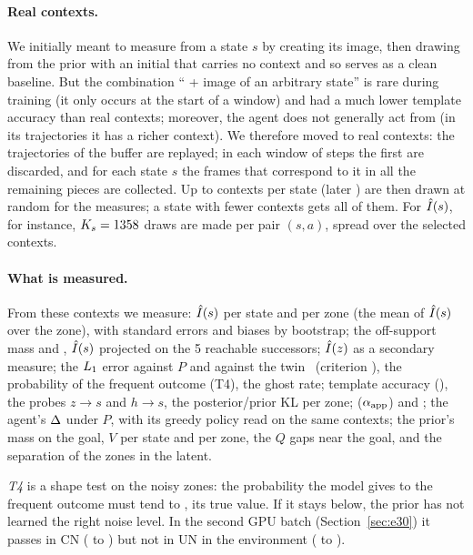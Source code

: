 \documentclass[10pt]{article}
\begin{document}
\paragraph{Real contexts.}
We initially meant to measure from a state $s$ by creating its image, then drawing from the prior with an initial \hzero{}
that carries no context and so serves as a clean baseline.
But the combination ``\hzero{} + image of an arbitrary state'' is rare during training (it only occurs at the start of a
window) and had a much lower template accuracy than real contexts; moreover, the agent does not generally act from \hzero{}
(in its trajectories it has a richer context).
We therefore moved to real contexts: the trajectories of the buffer are replayed; in each window of
\eThreeWindowLength{} steps the first \eThreeContextBurnIn{} are discarded, and for each state $s$ the frames that
correspond to it in all the remaining pieces are collected.
Up to \eThreeContextsPilot{} contexts per state (later \eThreeContextsFinal) are then drawn at random for the measures; a
state with fewer contexts gets all of them.
For $\hat{I}(s)$, for instance, $K_{s} = 1358$ draws are made per pair $(s, a)$, spread over the selected contexts.

\paragraph{What is measured.}
From these contexts we measure:
$\hat{I}(s)$ per state and per zone (the mean of $\hat{I}(s)$ over the zone), with standard errors and biases by bootstrap;
the off-support mass and \Isproj, $\hat{I}(s)$ projected on the 5 reachable successors; %
$\hat{I}(z)$ as a secondary measure;
the $L_{1}$ error against $P$ and against the twin~\twin{} (criterion \Cb), the probability of the frequent outcome (T4),
the ghost rate;
template accuracy (\Ca), the probes $z \to s$ and $h \to s$, the posterior/prior KL per zone;
\DOne{} ($\alpha_{\mathrm{app}}$) and \DTwo;
the agent's $\Delta$ under $P$, with its greedy policy read on the same contexts;
the prior's mass on the goal, $V$ per state and per zone, the $Q$ gaps near the goal, and the separation of the zones
in the latent.

\emph{T4} is a shape test on the noisy zones: the probability the model gives to the frequent outcome must tend to
\eThreeNoiseMain, its true value. If it stays below, the prior has not learned the right noise level. In the second GPU
batch (Section~\ref{sec:e30}) it passes in CN (\eThreeTFourCNMin{} to \eThreeTFourCNMax) but not in UN in the environment
(\eThreeTFourUNMin{} to \eThreeTFourUNMax).
\end{document}
